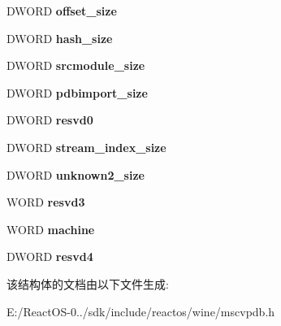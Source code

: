 \begin{DoxyCompactItemize}
\mbox{\label{struct___p_d_b___s_y_m_b_o_l_s_ada02eff9b787fb6deb68c13fa817719b}} 
D\+W\+O\+RD {\bfseries offset\+\_\+size}
\item 
\mbox{\label{struct___p_d_b___s_y_m_b_o_l_s_a1ccf3b6d535d72a0cad8ffbc9e2c218d}} 
D\+W\+O\+RD {\bfseries hash\+\_\+size}
\item 
\mbox{\label{struct___p_d_b___s_y_m_b_o_l_s_a262a8ac9d702d0c3d42f2d277456c2d8}} 
D\+W\+O\+RD {\bfseries srcmodule\+\_\+size}
\item 
\mbox{\label{struct___p_d_b___s_y_m_b_o_l_s_a681de930a641d9640fa964a48f0f64ec}} 
D\+W\+O\+RD {\bfseries pdbimport\+\_\+size}
\item 
\mbox{\label{struct___p_d_b___s_y_m_b_o_l_s_a8bdf84ef9404b7667200d4af5bfcd155}} 
D\+W\+O\+RD {\bfseries resvd0}
\item 
\mbox{\label{struct___p_d_b___s_y_m_b_o_l_s_a5702fbd165e1e902b0dffd9ff3edce9f}} 
D\+W\+O\+RD {\bfseries stream\+\_\+index\+\_\+size}
\item 
\mbox{\label{struct___p_d_b___s_y_m_b_o_l_s_a9a82cdf3d453574744baef76e2493b07}} 
D\+W\+O\+RD {\bfseries unknown2\+\_\+size}
\item 
\mbox{\label{struct___p_d_b___s_y_m_b_o_l_s_a12b4588428f0bcadb4da79ba4e05bf1b}} 
W\+O\+RD {\bfseries resvd3}
\item 
\mbox{\label{struct___p_d_b___s_y_m_b_o_l_s_a836499055d477d383eb100d155a3d961}} 
W\+O\+RD {\bfseries machine}
\item 
\mbox{\label{struct___p_d_b___s_y_m_b_o_l_s_a766291803eabb8dbe4b056c4b64bfc21}} 
D\+W\+O\+RD {\bfseries resvd4}
\end{DoxyCompactItemize}


该结构体的文档由以下文件生成\+:\begin{DoxyCompactItemize}
\item 
E\+:/\+React\+O\+S-\/0../sdk/include/reactos/wine/mscvpdb.\+h\end{DoxyCompactItemize}
